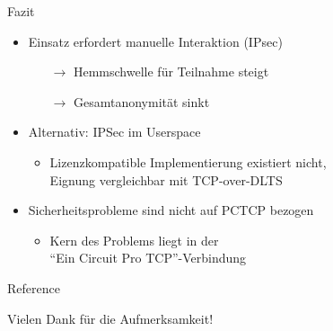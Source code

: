 \documentclass{beamer}
\begin{document}
\begin{frame}{Fazit}
  \begin{itemize}
    \item Einsatz erfordert manuelle Interaktion (IPsec) 
    \begin{itemize}
      \item[$\rightarrow$] Hemmschwelle für Teilnahme steigt
      \item[$\rightarrow$] Gesamtanonymität sinkt
    \end{itemize}
    \item Alternativ: IPSec im Userspace
    \begin{itemize}
      \item Lizenzkompatible Implementierung existiert nicht,\\Eignung vergleichbar mit TCP-over-DLTS
    \end{itemize}
    \item Sicherheitsprobleme sind nicht auf PCTCP bezogen
    \begin{itemize}
      \item Kern des Problems liegt in der\\ ``Ein Circuit Pro TCP''-Verbindung
    \end{itemize}
  \end{itemize}
\end{frame}




\begin{frame}[plain]{Reference}
  \begin{center}
  Vielen Dank für die Aufmerksamkeit!
  \end{center}
  \tiny
  
  
\end{frame}

\nocite{tor}
\nocite{tcp-over-dtls}
\nocite{pctcp}
\nocite{imux}
\nocite{tor_improvements}

\end{document}
